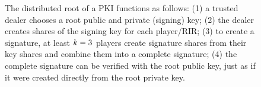 \begin{figure}
\begin{center}
\end{center}
\caption{\small The distributed root of a PKI functions as follows:
(1) a trusted dealer chooses a root public and private (signing) key;
(2) the dealer creates shares of the signing key for each player/RIR;
(3) to create a signature, at least $k=3$ players create signature
shares from their key shares and combine them into a complete
signature; (4) the complete signature can be verified with the root
public key, just as if it were created directly from the root private
key.}
\label{fig:sign-combine}
\end{figure}
